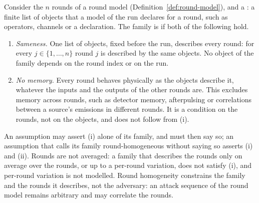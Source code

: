 \begin{definition}\label{def:round-homogeneity}
Consider the $n$ rounds of a round model (Definition~\ref{def:round-model}),
and a : a finite list of objects that a model of the
run declares for a round, such as operators, channels or a declaration. The
family is 
if both of the following hold.
\begin{enumerate}[label=(\roman*),leftmargin=2.4em]
\item \emph{Sameness.} One list of objects, fixed before the run, describes
  every round: for every $j\in\{1,\dots,n\}$ round $j$ is described by the
  same objects. No object of the family depends on the round index or on the
  run.
\item \emph{No memory.} Every round behaves physically as the objects
  describe it, whatever the inputs and the outputs of the other rounds are.
  This excludes memory across rounds, such as detector memory, afterpulsing
  or correlations between a source's emissions in different rounds. It is a
  condition on the rounds, not on the objects, and does not follow from (i).
\end{enumerate}
An assumption may assert (i) alone of its family, and must then say so; an
assumption that calls its family round-homogeneous without saying so asserts
(i) and (ii). Rounds are not averaged: a family that describes the rounds
only on average over the rounds, or up to a per-round variation, does not
satisfy (i), and
per-round variation is not modelled. Round homogeneity constrains the family
and the rounds it describes, not the adversary: an attack sequence of the
round model remains arbitrary and may correlate the rounds.
\end{definition}
